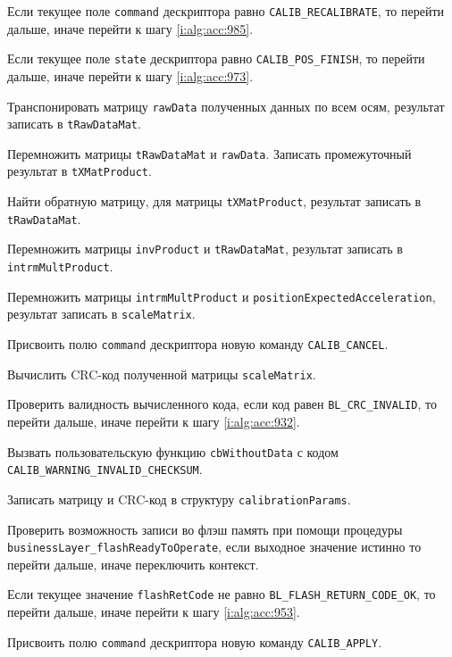 \begin{enumerate_step}
    \item \label{i:alg:acc:922} Если текущее поле \lstinline|command| дескриптора равно \lstinline|CALIB_RECALIBRATE|, то перейти дальше, иначе перейти к шагу
    \ref{i:alg:acc:985}.
    \item \label{i:alg:acc:924} Если текущее поле \lstinline|state| дескриптора равно \lstinline|CALIB_POS_FINISH|, то перейти дальше, иначе перейти к шагу
    \ref{i:alg:acc:973}.
    \item Транспонировать матрицу \lstinline|rawData| полученных данных по всем осям, результат записать в \lstinline|tRawDataMat|.
    \item Перемножить матрицы \lstinline|tRawDataMat| и \lstinline|rawData|. Записать промежуточный результат в \lstinline|tXMatProduct|.
    \item Найти обратную матрицу, для матрицы \lstinline|tXMatProduct|, результат записать в \lstinline|tRawDataMat|.
    \item Перемножить матрицы \lstinline|invProduct| и \lstinline|tRawDataMat|, результат записать в \lstinline|intrmMultProduct|.
    \item Перемножить матрицы \lstinline|intrmMultProduct| и \lstinline|positionExpectedAcceleration|, результат записать в \lstinline|scaleMatrix|.
    \item Присвоить полю \lstinline|command| дескриптора  новую команду \lstinline|CALIB_CANCEL|.
    \item Вычислить CRC-код полученной матрицы \lstinline|scaleMatrix|.
    \item Проверить валидность вычисленного кода, если код равен \lstinline|BL_CRC_INVALID|, то перейти дальше, иначе перейти к шагу \ref{i:alg:acc:932}.
    \item Вызвать пользовательскую функцию \lstinline|cbWithoutData| с кодом \lstinline|CALIB_WARNING_INVALID_CHECKSUM|.
    \item \label{i:alg:acc:932} Записать матрицу и CRC-код в структуру \lstinline|calibrationParams|.
    \item Проверить возможность записи во флэш память при помощи процедуры \lstinline|businessLayer_flashReadyToOperate|, если выходное значение истинно то перейти дальше, иначе переключить контекст.
    \item Если текущее значение \lstinline|flashRetCode| не равно \lstinline|BL_FLASH_RETURN_CODE_OK|, то перейти дальше, иначе перейти к шагу
    \ref{i:alg:acc:953}.
    \item Присвоить полю \lstinline|command| дескриптора  новую команду \lstinline|CALIB_APPLY|.

\end{enumerate_step}
